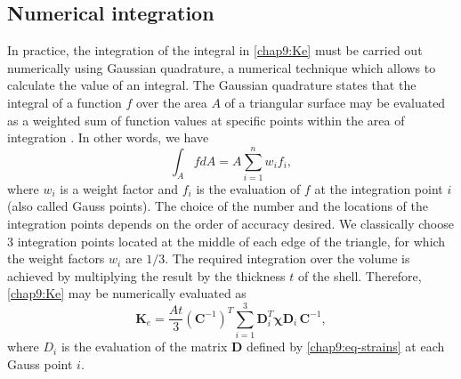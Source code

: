 	\subsection{Numerical integration} \label{chap9:numericalIntegration}
In practice, the integration of the integral in \eqref{chap9:Ke} must be carried out numerically using Gaussian quadrature, a numerical technique which allows to calculate the value of an integral. The Gaussian quadrature states that the integral of a function $ f $ over the area $ A $ of a triangular surface may be evaluated as a weighted sum of function values at specific points within the area of integration \citep{Cowper73}. In other words, we have
\begin{equation}
\int_{A} f dA = A \sum_{i=1}^n w_i f_i,
\end{equation}
where $ w_i $ is a weight factor and $ f_i $ is the evaluation of $ f $ at the integration point $ i $ (also called Gauss points). The choice of the number and the locations of the integration points depends on the order of accuracy desired. We classically choose 3 integration points located at the middle of each edge of the triangle, for which the weight factors $ w_i $ are $ 1/3 $. The required integration over the volume is achieved by multiplying the result by the thickness $ t $ of the shell. Therefore, \eqref{chap9:Ke} may be numerically evaluated as
\begin{equation}
\textbf{K}_e = \dfrac{A t}{3} (\textbf{C}^{-1})^T \sum_{i=1}^3 \textbf{D}_i^{T} \boldsymbol\chi \textbf{D}_i  \, \textbf{C}^{-1},
\end{equation}
where $ D_i $ is the evaluation of the matrix $ \mathbf{D} $ defined by \eqref{chap9:eq-strains} at each Gauss point $ i $. 

\bigskip

